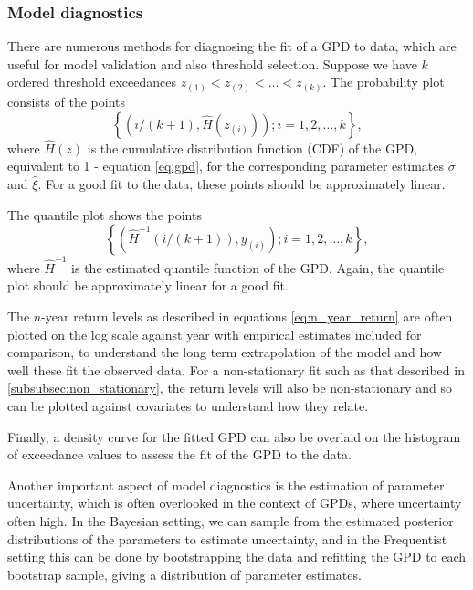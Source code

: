 \documentclass{article}
\numberwithin{equation}{section}
\begin{document}
\subsubsection{Model diagnostics} \label{subsubsec:uni_diagnostics}
There are numerous methods for diagnosing the fit of a GPD to data, which are useful for  model validation and also threshold selection.
Suppose we have $k$ ordered threshold exceedances $z_{(1)} < z_{(2)} < \ldots < z_{(k)}$.
The probability plot consists of the points
\begin{equation} \label{eq:prob_plot}
  \left\{ \left(i/(k + 1), \hat{H}\left(z_{(i)}\right)\right); i = 1, 2, \ldots, k \right\}, 
\end{equation}
where $\hat{H}(z)$ is the cumulative distribution function (CDF) of the GPD, equivalent to 1 - equation \ref{eq:gpd}, for the corresponding parameter estimates $\hat{\sigma}$ and $\hat{\xi}$. 
For a good fit to the data, these points should be approximately linear.

The quantile plot shows the points
\begin{equation} \label{eq:quantile_plot}
  \left\{ \left( \hat{H}^{-1}(i/(k+1)) , y_{(i)}\right); i = 1, 2, \ldots, k \right\},
\end{equation}
where $\hat{H}^{-1}$ is the estimated quantile function of the GPD.
Again, the quantile plot should be approximately linear for a good fit.

The $n$-year return levels as described in equations \ref{eq:n_year_return} are often plotted on the log scale against year with empirical estimates included for comparison, to understand the long term extrapolation of the model and how well these fit the observed data. For a non-stationary fit such as that described in \ref{subsubsec:non_stationary}, the return levels will also be non-stationary and so can be plotted against covariates to understand how they relate.

Finally, a density curve for the fitted GPD can also be overlaid on the histogram of exceedance values to assess the fit of the GPD to the data.

Another important aspect of model diagnostics is the estimation of parameter uncertainty, which is often overlooked in the context of GPDs, where uncertainty often high.
In the Bayesian setting, we can sample from the estimated posterior distributions of the parameters to estimate uncertainty, and in the Frequentist setting this can be done by bootstrapping the data and refitting the GPD to each bootstrap sample, giving a distribution of parameter estimates.
\end{document}
